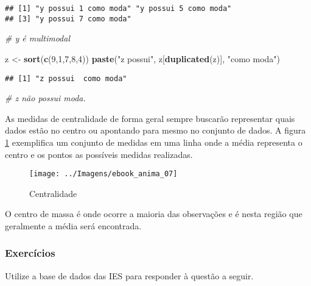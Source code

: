 \documentclass[11pt,]{style/krantz}
\makeatletter
\newenvironment{Shaded}{\begin{snugshade}}{\end{snugshade}}
\newcommand{\CommentTok}[1]{\textcolor[rgb]{0.56,0.35,0.01}{\textit{#1}}}
\newcommand{\DecValTok}[1]{\textcolor[rgb]{0.00,0.00,0.81}{#1}}
\newcommand{\KeywordTok}[1]{\textcolor[rgb]{0.13,0.29,0.53}{\textbf{#1}}}
\newcommand{\NormalTok}[1]{#1}
\newcommand{\StringTok}[1]{\textcolor[rgb]{0.31,0.60,0.02}{#1}}
\newenvironment{kframe}{%
\medskip{}
\setlength{\fboxsep}{.8em}
 \def\at@end@of@kframe{}%
 \ifinner\ifhmode%
  \def\at@end@of@kframe{\end{minipage}}%
  \begin{minipage}{\columnwidth}%
 \fi\fi%
 \def\FrameCommand##1{\hskip\@totalleftmargin \hskip-\fboxsep
 \colorbox{shadecolor}{##1}\hskip-\fboxsep
     \hskip-\linewidth \hskip-\@totalleftmargin \hskip\columnwidth}%
 \MakeFramed {\advance\hsize-\width
   \@totalleftmargin\z@ \linewidth\hsize
   \@setminipage}}%
 {\par\unskip\endMakeFramed%
 \at@end@of@kframe}
\renewenvironment{Shaded}{\begin{kframe}}{\end{kframe}}
\theoremstyle{definition}
\theoremstyle{definition}
\theoremstyle{definition}
\theoremstyle{remark}
\makeatother
\begin{document}
\begin{verbatim}
## [1] "y possui 1 como moda" "y possui 5 como moda"
## [3] "y possui 7 como moda"
\end{verbatim}

\begin{Shaded}
\begin{Highlighting}[]
\CommentTok{# y é multimodal}

\NormalTok{z <-}\StringTok{ }\KeywordTok{sort}\NormalTok{(}\KeywordTok{c}\NormalTok{(}\DecValTok{9}\NormalTok{,}\DecValTok{1}\NormalTok{,}\DecValTok{7}\NormalTok{,}\DecValTok{8}\NormalTok{,}\DecValTok{4}\NormalTok{))}
\KeywordTok{paste}\NormalTok{(}\StringTok{"z possui"}\NormalTok{, z[}\KeywordTok{duplicated}\NormalTok{(z)], }\StringTok{"como moda"}\NormalTok{)}
\end{Highlighting}
\end{Shaded}

\begin{verbatim}
## [1] "z possui  como moda"
\end{verbatim}

\begin{Shaded}
\begin{Highlighting}[]
\CommentTok{# z não possui moda.}
\end{Highlighting}
\end{Shaded}

As medidas de centralidade de forma geral sempre buscarão representar quais dados estão no centro ou apontando para mesmo no conjunto de dados.
A figura \ref{fig:fig08} exemplifica um conjunto de medidas em uma linha onde a média representa o centro e os pontos as possíveis medidas realizadas.

\begin{figure}[H]

{\centering \texttt{[image: ../Imagens/ebook\_anima\_07]} 

}

\caption{Centralidade}\label{fig:fig08}
\end{figure}

O centro de massa é onde ocorre a maioria das observações e é nesta região que geralmente a média será encontrada.

\hypertarget{exercicios-1}{%
\subsubsection{Exercícios}\label{exercicios-1}}

Utilize a base de dados das IES para responder à questão a seguir.
\end{document}
